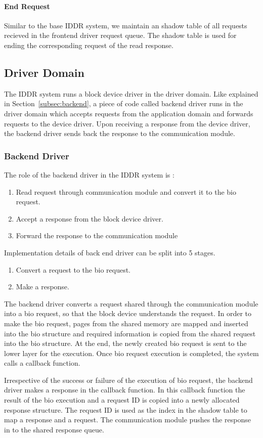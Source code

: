 \paragraph{End Request}
Similar to the base IDDR system, we maintain an shadow table of all requests recieved in the frontend driver request queue. The shadow table is used for ending the corresponding request of the read response. 

\subsection{Driver Domain}
The IDDR system runs a block device driver in the driver domain. Like explained in Section~\ref{subsec:backend}, a piece of code called backend driver runs in the driver domain which accepts requests from the application domain and forwards requests to the device driver. Upon receiving a response from the device driver, the backend driver sends back the response to the communication module.

\subsubsection*{Backend Driver}
The role of the backend driver in the IDDR system is :
\begin{enumerate}
\item Read request through communication module and convert it to the bio request.
\item Accept a response from the block device driver.
\item Forward the response to the communication module
\end{enumerate}

Implementation details of back end driver can be split into 5 stages. 
\begin{enumerate}
\item Convert a request to the bio request. 
\item Make a response.
\end{enumerate}

\label{subsec:createbio}
The backend driver converts a request shared through the communication module into a bio request, so that the block device understands the request. In order to make the bio request, pages from the shared memory are mapped and inserted into the bio structure and required information is copied from the shared request into the bio structure. At the end, the newly created bio request is sent to the lower layer for the execution. Once bio request execution is completed, the system calls a callback function.

Irrespective of the success or failure of the execution of bio request, the backend driver makes a response in the callback function. In this callback function the result of the bio execution and a request ID is copied into a newly allocated response structure. The request ID is used as the index in the shadow table to map a response and a request. The communication module pushes the response in to the shared response queue.

% 

